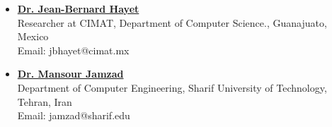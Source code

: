 \documentclass[10pt]{res}
\begin{document}
\begin{resume}
\begin{itemize}
\item   {\bf \href{http://aplicaciones.cimat.mx/Personal/jbhayet} {Dr. Jean-Bernard Hayet} }\\
Researcher at CIMAT, Department of Computer Science., Guanajuato, Mexico\\
Email: jbhayet@cimat.mx


\item   {\bf \href{http://ce.sharif.edu/~jamzad} {Dr. Mansour Jamzad} }\\
Department of Computer Engineering, Sharif University of Technology, Tehran, Iran\\
Email: jamzad@sharif.edu




\end{itemize}

\end{resume}
\end{document}
